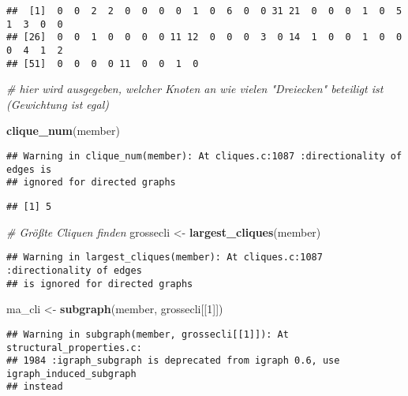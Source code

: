 \documentclass[
]{article}
\newenvironment{Shaded}{\begin{snugshade}}{\end{snugshade}}
\newcommand{\CommentTok}[1]{\textcolor[rgb]{0.56,0.35,0.01}{\textit{#1}}}
\newcommand{\DecValTok}[1]{\textcolor[rgb]{0.00,0.00,0.81}{#1}}
\newcommand{\KeywordTok}[1]{\textcolor[rgb]{0.13,0.29,0.53}{\textbf{#1}}}
\newcommand{\NormalTok}[1]{#1}
\newcommand{\StringTok}[1]{\textcolor[rgb]{0.31,0.60,0.02}{#1}}
\begin{document}
\begin{verbatim}
##  [1]  0  0  2  2  0  0  0  0  1  0  6  0  0 31 21  0  0  0  1  0  5  1  3  0  0
## [26]  0  0  1  0  0  0  0 11 12  0  0  0  3  0 14  1  0  0  1  0  0  0  4  1  2
## [51]  0  0  0  0 11  0  0  1  0
\end{verbatim}

\begin{Shaded}
\begin{Highlighting}[]
\CommentTok{# hier wird ausgegeben, welcher Knoten an wie vielen "Dreiecken" beteiligt ist (Gewichtung ist egal)}

\KeywordTok{clique_num}\NormalTok{(member)}
\end{Highlighting}
\end{Shaded}

\begin{verbatim}
## Warning in clique_num(member): At cliques.c:1087 :directionality of edges is
## ignored for directed graphs
\end{verbatim}

\begin{verbatim}
## [1] 5
\end{verbatim}

\begin{Shaded}
\begin{Highlighting}[]
\CommentTok{# Größte Cliquen finden}
\NormalTok{grossecli <-}\StringTok{ }\KeywordTok{largest_cliques}\NormalTok{(member)}
\end{Highlighting}
\end{Shaded}

\begin{verbatim}
## Warning in largest_cliques(member): At cliques.c:1087 :directionality of edges
## is ignored for directed graphs
\end{verbatim}

\begin{Shaded}
\begin{Highlighting}[]
\NormalTok{ma_cli <-}\StringTok{ }\KeywordTok{subgraph}\NormalTok{(member, grossecli[[}\DecValTok{1}\NormalTok{]])}
\end{Highlighting}
\end{Shaded}

\begin{verbatim}
## Warning in subgraph(member, grossecli[[1]]): At structural_properties.c:
## 1984 :igraph_subgraph is deprecated from igraph 0.6, use igraph_induced_subgraph
## instead
\end{verbatim}
\end{document}

